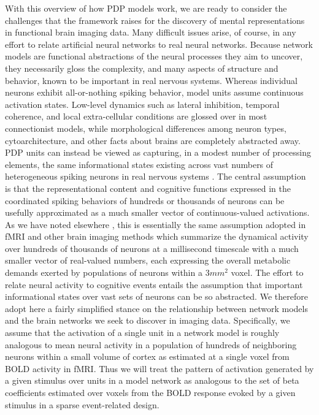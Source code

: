 With this overview of how PDP models work, we are ready to consider the challenges that the framework raises for the discovery of mental representations in functional brain imaging data. Many difficult issues arise, of course, in any effort to relate artificial neural networks to real neural networks. Because network models are functional abstractions of the neural processes they aim to uncover, they necessarily gloss the complexity, and many aspects of structure and behavior, known to be important in real nervous systems. Whereas individual neurons exhibit all-or-nothing spiking behavior, model units assume continuous activation states. Low-level dynamics such as lateral inhibition, temporal coherence, and local extra-cellular conditions are glossed over in most connectionist models, while morphological differences among neuron types, cytoarchitecture, and other facts about brains are completely abstracted away. PDP units can instead be viewed as capturing, in a modest number of processing elements, the same informational states existing across vast numbers of heterogeneous spiking neurons in real nervous systems \cite{Smolensky86,rogers2014parallel}. The central assumption is that the representational content and cognitive functions expressed in the coordinated spiking behaviors of hundreds or thousands of neurons can be usefully approximated as a much smaller vector of continuous-valued activations. As we have noted elsewhere \cite{CoxSeidenbergRogersIP}, this is essentially the same assumption adopted in fMRI and other brain imaging methods which summarize the dynamical activity over hundreds of thousands of neurons at a millisecond timescale with a much smaller vector of real-valued numbers, each expressing the overall metabolic demands exerted by populations of neurons within a $3mm^2$ voxel. The effort to relate neural activity to cognitive events entails the assumption that important informational states over vast sets of neurons can be so abstracted. We therefore adopt here a fairly simplified stance on the relationship between network models and the brain networks we seek to discover in imaging data. Specifically, we assume that the activation of a single unit in a network model is roughly analogous to mean neural activity in a population of hundreds of neighboring neurons within a small volume of cortex as estimated at a single voxel from BOLD activity in fMRI. Thus we will treat the pattern of activation generated by a given stimulus over units in a model network as analogous to the set of beta coefficients estimated over voxels from the BOLD response evoked by a given stimulus in a sparse event-related design. 


